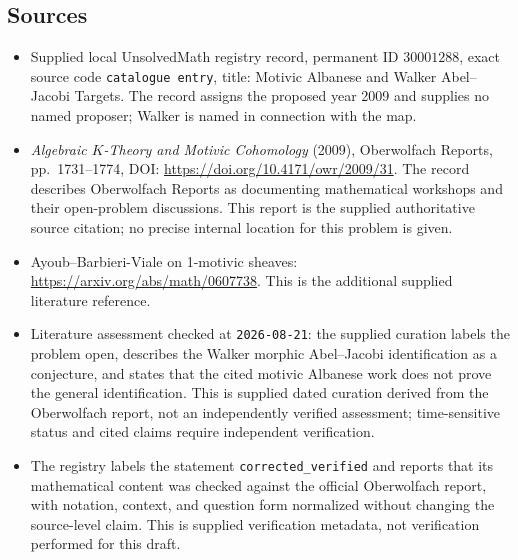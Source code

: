 \documentclass[11pt]{article}
\begin{document}
\subsection{Sources}
\begin{itemize}
\item Supplied local UnsolvedMath registry record, permanent ID \(30001288\), exact source code \texttt{catalogue entry}, title: Motivic Albanese and Walker Abel--Jacobi Targets. The record assigns the proposed year 2009 and supplies no named proposer; Walker is named in connection with the map.
\item \emph{Algebraic \(K\)-Theory and Motivic Cohomology} (2009), Oberwolfach Reports, pp.~1731--1774, DOI: \url{https://doi.org/10.4171/owr/2009/31}. The record describes Oberwolfach Reports as documenting mathematical workshops and their open-problem discussions. This report is the supplied authoritative source citation; no precise internal location for this problem is given.
\item Ayoub--Barbieri-Viale on 1-motivic sheaves: \url{https://arxiv.org/abs/math/0607738}. This is the additional supplied literature reference.
\item Literature assessment checked at \texttt{2026-08-21}: the supplied curation labels the problem open, describes the Walker morphic Abel--Jacobi identification as a conjecture, and states that the cited motivic Albanese work does not prove the general identification. This is supplied dated curation derived from the Oberwolfach report, not an independently verified assessment; time-sensitive status and cited claims require independent verification.
\item The registry labels the statement \texttt{corrected\_verified} and reports that its mathematical content was checked against the official Oberwolfach report, with notation, context, and question form normalized without changing the source-level claim. This is supplied verification metadata, not verification performed for this draft.
\end{itemize}
\end{document}
